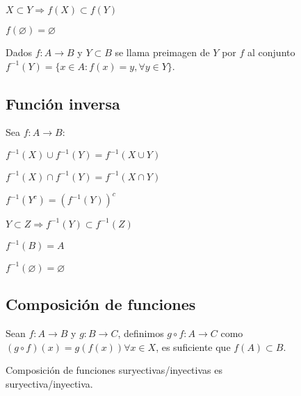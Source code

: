 \begin{prop}
    $X \subset Y \Rightarrow f(X) \subset f(Y)$
\end{prop}

\begin{prop}
    $f(\varnothing) = \varnothing$
\end{prop}

\begin{definition}
    Dados $f: A \to B$ y $Y \subset B$ se llama preimagen de $Y$ por $f$ al conjunto $f^{-1}(Y) = \{x \in A : f(x) = y, \forall y \in Y\}$.
\end{definition}

\subsection{Función inversa}

Sea $f: A \to B$:

\begin{prop}
    $f^{-1}(X) \cup f^{-1}(Y) = f^{-1}(X \cup Y)$
\end{prop}

\begin{prop}
    $f^{-1}(X) \cap f^{-1}(Y) = f^{-1}(X \cap Y)$
\end{prop}

\begin{prop}
    $f^{-1}(Y^c) = (f^{-1}(Y))^c$
\end{prop}

\begin{prop}
    $Y \subset Z \Rightarrow f^{-1}(Y) \subset f^{-1}(Z)$
\end{prop}

\begin{prop}
    $f^{-1}(B) = A$
\end{prop}

\begin{prop}
    $f^{-1}(\varnothing) = \varnothing$
\end{prop}

\subsection{Composición de funciones}

Sean $f: A \to B$ y $g: B \to C$, definimos $g \circ f: A \to C$ como $(g \circ f)(x) = g(f(x)) \forall x \in X$, es suficiente que $f(A) \subset B$.

\begin{prop}
    Composición de funciones suryectivas/inyectivas es \\ suryectiva/inyectiva.
\end{prop}

